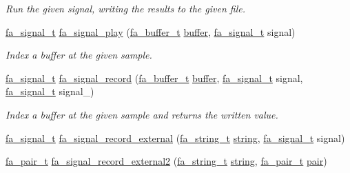 \begin{DoxyCompactItemize}
\begin{DoxyCompactList}\small\item\em Run the given signal, writing the results to the given file. \end{DoxyCompactList}\item 
\hyperlink{group___fa_signal_gac5c72f160cd6e93a6783551627b166e5}{fa\-\_\-signal\-\_\-t} \hyperlink{group___fa_signal_ga98b24b4269b7e5948ac9932cde07176b}{fa\-\_\-signal\-\_\-play} (\hyperlink{group___fa_buffer_ga0ed7a1d783ab322e2e8be02432d0839e}{fa\-\_\-buffer\-\_\-t} \hyperlink{util_8h_ad0c623e8b04565926f5b48888327724a}{buffer}, \hyperlink{group___fa_signal_gac5c72f160cd6e93a6783551627b166e5}{fa\-\_\-signal\-\_\-t} signal)
\begin{DoxyCompactList}\small\item\em Index a buffer at the given sample. \end{DoxyCompactList}\item 
\hyperlink{group___fa_signal_gac5c72f160cd6e93a6783551627b166e5}{fa\-\_\-signal\-\_\-t} \hyperlink{group___fa_signal_ga99e37a38fa97b9ff437074e80494f0aa}{fa\-\_\-signal\-\_\-record} (\hyperlink{group___fa_buffer_ga0ed7a1d783ab322e2e8be02432d0839e}{fa\-\_\-buffer\-\_\-t} \hyperlink{util_8h_ad0c623e8b04565926f5b48888327724a}{buffer}, \hyperlink{group___fa_signal_gac5c72f160cd6e93a6783551627b166e5}{fa\-\_\-signal\-\_\-t} signal, \hyperlink{group___fa_signal_gac5c72f160cd6e93a6783551627b166e5}{fa\-\_\-signal\-\_\-t} signal\-\_\-)
\begin{DoxyCompactList}\small\item\em Index a buffer at the given sample and returns the written value. \end{DoxyCompactList}\item 
\hyperlink{group___fa_signal_gac5c72f160cd6e93a6783551627b166e5}{fa\-\_\-signal\-\_\-t} \hyperlink{group___fa_signal_gabe9bb3bac5061d2fc8163a1838b3b1b5}{fa\-\_\-signal\-\_\-record\-\_\-external} (\hyperlink{group___fa_string_gacada63033b77bc6c39fa632ae199349b}{fa\-\_\-string\-\_\-t} \hyperlink{util_8h_a41106000aac73b61e4fc2ef9dd39a603}{string}, \hyperlink{group___fa_signal_gac5c72f160cd6e93a6783551627b166e5}{fa\-\_\-signal\-\_\-t} signal)
\item 
\hyperlink{group___fa_pair_gac2b2e58c230bac4f8a63ef6c05072680}{fa\-\_\-pair\-\_\-t} \hyperlink{group___fa_signal_gaa8499e516fceae6410aff52f3e551a73}{fa\-\_\-signal\-\_\-record\-\_\-external2} (\hyperlink{group___fa_string_gacada63033b77bc6c39fa632ae199349b}{fa\-\_\-string\-\_\-t} \hyperlink{util_8h_a41106000aac73b61e4fc2ef9dd39a603}{string}, \hyperlink{group___fa_pair_gac2b2e58c230bac4f8a63ef6c05072680}{fa\-\_\-pair\-\_\-t} \hyperlink{util_8h_a40ed40659d2ed7f8712b0fe6ba6edebe}{pair})

\end{DoxyCompactItemize}
